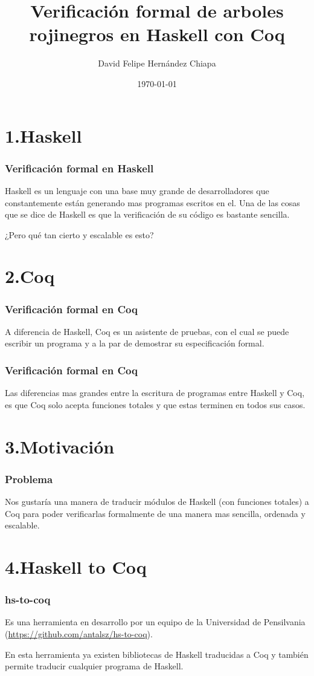 \documentclass[xcolor=dvipsnames,table,handout]{beamer}
\title[]{Verificación formal de arboles rojinegros en Haskell con Coq}
\author[]{David Felipe Hernández Chiapa}
\institute[UNAM-FC]{Facultad de Ciencias\\
Universidad Nacional Aut\'onoma de M\'exico}
\date[]{\small{\today}}
\begin{document}
\frame{\titlepage}

\section{1.Haskell}
\begin{frame}
  \frametitle{Verificación formal en Haskell}
    Haskell es un lenguaje con una base muy grande de desarrolladores que constantemente están generando mas programas escritos en el.
    \newline Una de las cosas que se dice de Haskell es que la verificación de su código es bastante sencilla.

\pause\newline\centering¿Pero qué tan cierto y escalable es esto?
\end{frame}

\section{2.Coq}
\begin{frame}
  \frametitle{Verificación formal en Coq}
	A diferencia de Haskell, Coq es un asistente de pruebas, con el cual se puede escribir un programa y a la par de demostrar su especificación formal.
\end{frame}

\begin{frame}
  \frametitle{Verificación formal en Coq}
    Las diferencias mas grandes entre la escritura de programas entre Haskell y Coq, es que Coq solo acepta funciones totales y que estas terminen en todos sus casos.
\end{frame}
\section{3.Motivación}
\begin{frame}
  \frametitle{Problema}
       Nos gustaría una manera de traducir módulos de Haskell (con funciones totales) a Coq para poder verificarlas formalmente de una manera mas sencilla, ordenada y escalable.
\end{frame}
\section{4.Haskell to Coq}
\begin{frame}
  \frametitle{hs-to-coq}
       Es una herramienta en desarrollo por un equipo de la Universidad de Pensilvania (\url{https://github.com/antalsz/hs-to-coq}).

       En esta herramienta ya existen bibliotecas de Haskell traducidas a Coq y también permite traducir cualquier programa de Haskell.
\end{frame}
\end{document}
